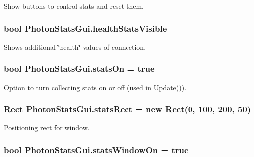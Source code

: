 Show buttons to control stats and reset them.

\subsubsection[{\texorpdfstring{health\+Stats\+Visible}{healthStatsVisible}}]{\setlength{\rightskip}{0pt plus 5cm}bool Photon\+Stats\+Gui.\+health\+Stats\+Visible}\hypertarget{class_photon_stats_gui_a05204c8969fd4fc0546f7926e5e5da8e}{}\label{class_photon_stats_gui_a05204c8969fd4fc0546f7926e5e5da8e}


Shows additional \char`\"{}health\char`\"{} values of connection.

\subsubsection[{\texorpdfstring{stats\+On}{statsOn}}]{\setlength{\rightskip}{0pt plus 5cm}bool Photon\+Stats\+Gui.\+stats\+On = true}\hypertarget{class_photon_stats_gui_a7e1cb11640167171f7b160089b71e5d7}{}\label{class_photon_stats_gui_a7e1cb11640167171f7b160089b71e5d7}


Option to turn collecting stats on or off (used in \hyperlink{class_photon_stats_gui_a222bbb9f4b1c640489101a5f3bcada8a}{Update()}).

\subsubsection[{\texorpdfstring{stats\+Rect}{statsRect}}]{\setlength{\rightskip}{0pt plus 5cm}Rect Photon\+Stats\+Gui.\+stats\+Rect = new Rect(0, 100, 200, 50)}\hypertarget{class_photon_stats_gui_af9e7598de2be45c63c6368727bb60ae5}{}\label{class_photon_stats_gui_af9e7598de2be45c63c6368727bb60ae5}


Positioning rect for window.

\subsubsection[{\texorpdfstring{stats\+Window\+On}{statsWindowOn}}]{\setlength{\rightskip}{0pt plus 5cm}bool Photon\+Stats\+Gui.\+stats\+Window\+On = true}\hypertarget{class_photon_stats_gui_aac6e6189d7a7723ef4fbcbb5c7a6b6e8}{}\label{class_photon_stats_gui_aac6e6189d7a7723ef4fbcbb5c7a6b6e8}



